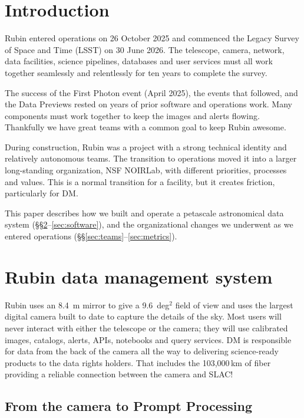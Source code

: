 
\section{Introduction}
\label{sec:intro}

Rubin entered operations on 26 October 2025 and commenced the Legacy Survey of Space and Time (LSST) \citep{2008arXiv0805.2366I} on 30 June 2026.
The telescope, camera, network, data facilities, science pipelines, databases and user services must all work together seamlessly and relentlessly for ten years to complete the survey.

The success of the First Photon event (April 2025), the events that followed, and the Data Previews rested on years of prior software and operations work.
Many components must work together to keep the images and alerts flowing.
Thankfully we have great teams with a common goal to keep Rubin awesome.

During construction, Rubin was a project with a strong technical identity and relatively autonomous teams.
The transition to operations moved it into a larger long-standing organization, NSF NOIRLab, with different priorities, processes and values.
This is a normal transition for a facility, but it creates friction, particularly for DM.

This paper describes how we built and operate a petascale astronomical data system (\S\S\ref{sec:data-system}--\ref{sec:software}), and the organizational changes we underwent as we entered operations (\S\S\ref{sec:teams}--\ref{sec:metrics}).

\section{Rubin data management system}
\label{sec:data-system}

Rubin uses an 8.4~m mirror to give a 9.6~deg$^2$ field of view and uses the largest digital camera built to date to capture the details of the sky.
Most users will never interact with either the telescope or the camera; they will use calibrated images, catalogs, alerts, APIs, notebooks and query services.
DM is responsible for data from the back of the camera all the way to delivering science-ready products to the data rights holders.
That includes the 103,000\,km of fiber providing a reliable connection between the camera and SLAC!

\subsection{From the camera to Prompt Processing}
\label{sec:prompt}


